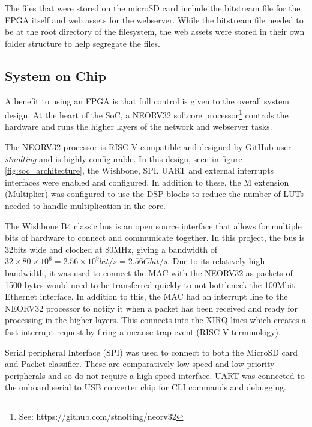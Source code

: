 \noindent The files that were stored on the microSD card include the bitstream file for the FPGA itself and web assets for the webserver. While the bitstream file needed to be at the root directory of the filesystem, the web assets were stored in their own folder structure to help segregate the files.  








 
\subsection{System on Chip}

A benefit to using an FPGA is that full control is given to the overall system design. At the heart of the SoC, a NEORV32 softcore processor\footnote[1]{See: https://github.com/stnolting/neorv32} controls the hardware and runs the higher layers of the network and webserver tasks.

The NEORV32 processor is RISC-V compatible and designed by GitHub user \textit{stnolting} and is highly configurable. In this design, seen in figure \ref{fig:soc_architecture}, the Wishbone, SPI, UART and external interrupts interfaces were enabled and configured. In addition to these, the M extension (Multiplier) was configured to use the DSP blocks to reduce the number of LUTs needed to handle multiplication in the core. 

The Wishbone B4 classic bus is an open source interface that allows for multiple bits of hardware to connect and communicate together. In this project, the bus is 32bits wide and clocked at 80MHz, giving a bandwidth of $32 \times 80 \times 10^6 = 2.56\times 10^9bit/s=2.56Gbit/s$. Due to its relatively high bandwidth, it was used to connect the MAC with the NEORV32 as packets of 1500 bytes would need to be transferred quickly to not bottleneck the 100Mbit Ethernet interface. In addition to this, the MAC had an interrupt line to the NEORV32 processor to notify it when a packet has been received and ready for processing in the higher layers. This connects into the XIRQ lines which creates a fast interrupt request by firing a mcause trap event (RISC-V terminology).

Serial peripheral Interface (SPI) was used to connect to both the MicroSD card and Packet classifier. These are comparatively low speed and low priority peripherals and so do not require a high speed interface. UART was connected to the onboard serial to USB converter chip for CLI commands and debugging. 



